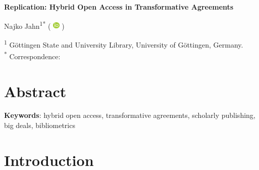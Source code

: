 \documentclass[a4paper,man,floatsintext,longtable,noextraspace,10pt]{apa6}
\begin{document}
\thispagestyle{otherpage}


\begin{large}
\textbf{Replication: Hybrid Open Access in Transformative Agreements}
\end{large}

\newcommand{\orcid}{%
  \begingroup\normalfont
  \includegraphics[height=0.9em]{orcid_logo}%
  \endgroup
}

Najko Jahn\textsuperscript{1}\textsuperscript{*} 
(\orcid{} \href{https://orcid.org/0000-0001-5105-1463}{\color{black}{0000-0001-5105-1463}})

\textsuperscript{1} Göttingen State and University Library, University of Göttingen, Germany. \\

\textsuperscript{*} Correspondence: \href{mailto:najko.jahn@sub.uni-goettingen.de}{\color{black}{najko.jahn@sub.uni-goettingen.de}} 

\section*{Abstract}
{}
{\textbf{Keywords}: hybrid open access, transformative agreements, scholarly publishing, big deals, bibliometrics}

\newpage

\setcounter{secnumdepth}{2}

\section{Introduction}\label{introduction}
\end{document}
